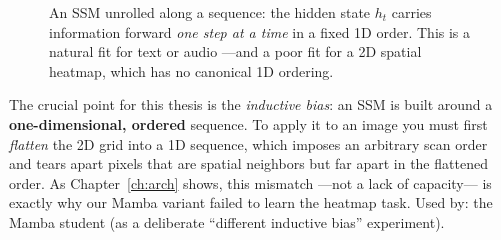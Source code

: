 \begin{figure}[H]
\centering
{}
\caption{An SSM unrolled along a sequence: the hidden state $h_t$ carries information forward
\emph{one step at a time} in a fixed 1D order. This is a natural fit for text or audio ---and a poor
fit for a 2D spatial heatmap, which has no canonical 1D ordering.}
\label{fig:blocks:ssm}
\end{figure}

The crucial point for this thesis is the \emph{inductive bias}: an SSM is built around a
\textbf{one-dimensional, ordered} sequence. To apply it to an image you must first \emph{flatten} the
2D grid into a 1D sequence, which imposes an arbitrary scan order and tears apart pixels that are
spatial neighbors but far apart in the flattened order. As Chapter~\ref{ch:arch} shows, this mismatch
---not a lack of capacity--- is exactly why our Mamba variant failed to learn the heatmap task. Used
by: the Mamba student (as a deliberate ``different inductive bias'' experiment).
